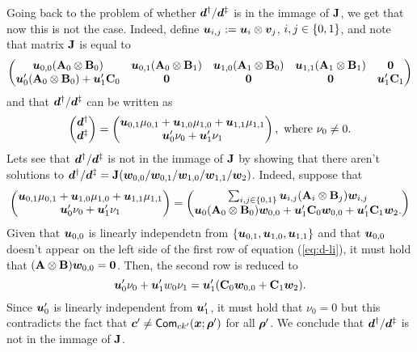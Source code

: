 Going back to the problem of whether ${\boldsymbol{d}}^\dag/ {\boldsymbol{d}}^\ddag$ is in the immage of $\mathbf{{J}}$, we get that now this is not the case. Indeed, define ${\boldsymbol{u}}_{i,j}:={\boldsymbol{u}}_i\otimes{\boldsymbol{v}}_j$, $i,j\in\{0,1\}$, and note that matrix $\mathbf{{J}}$ is equal to
$$
\begin{pmatrix}
{\boldsymbol{u}}_{0,0}(\mathbf{{A}}_0\otimes\mathbf{{B}}_0) & {\boldsymbol{u}}_{0,1}(\mathbf{{A}}_0\otimes\mathbf{{B}}_1) & {\boldsymbol{u}}_{1,0}(\mathbf{{A}}_1\otimes\mathbf{{B}}_0) & {\boldsymbol{u}}_{1,1}(\mathbf{{A}}_1\otimes\mathbf{{B}}_1) & {\boldsymbol{0}}\\
{\boldsymbol{u}}'_0(\mathbf{{A}}_0\otimes\mathbf{{B}}_0) +{\boldsymbol{u}}'_1\mathbf{{C}}_0 & {\boldsymbol{0}} & {\boldsymbol{0}} & {\boldsymbol{0}} & {\boldsymbol{u}}'_1\mathbf{{C}}_1
\end{pmatrix}
$$
and that ${\boldsymbol{d}}^\dag/{\boldsymbol{d}}^\ddag$ can be written as
$$
\begin{pmatrix} {\boldsymbol{d}}^\dag\\ {\boldsymbol{d}}^\ddag \end{pmatrix}
=
\begin{pmatrix}
{\boldsymbol{u}}_{0,1}\mu_{0,1} + {\boldsymbol{u}}_{1,0}\mu_{1,0} + {\boldsymbol{u}}_{1,1}\mu_{1,1}\\
{\boldsymbol{u}}'_{0}\nu_{0} + {\boldsymbol{u}}'_1\nu_1
\end{pmatrix},
\text{ where } \nu_0 \neq 0.
$$
Lets see that ${\boldsymbol{d}}^\dag/{\boldsymbol{d}}^\ddag$ is not in the immage of $\mathbf{{J}}$ by showing that there aren't solutions to ${\boldsymbol{d}}^\dag/{\boldsymbol{d}}^\ddag=\mathbf{{J}}({\boldsymbol{w}}_{0,0}/{\boldsymbol{w}}_{0,1}/{\boldsymbol{w}}_{1,0}/{\boldsymbol{w}}_{1,1}/{\boldsymbol{w}}_2)$. Indeed, suppose that
\begin{align}
\begin{pmatrix}
{\boldsymbol{u}}_{0,1}\mu_{0,1} + {\boldsymbol{u}}_{1,0}\mu_{1,0} + {\boldsymbol{u}}_{1,1}\mu_{1,1}\\
{\boldsymbol{u}}'_{0}\nu_{0} + {\boldsymbol{u}}'_1\nu_1
\end{pmatrix}
=
\begin{pmatrix}
\sum_{i,j\in\{0,1\}}{\boldsymbol{u}}_{i,j}(\mathbf{{A}}_i\otimes\mathbf{{B}}_j){\boldsymbol{w}}_{i,j}\\
{\boldsymbol{u}}_0(\mathbf{{A}}_0\otimes\mathbf{{B}}_0){\boldsymbol{w}}_{0,0} + {\boldsymbol{u}}'_1\mathbf{{C}}_0{\boldsymbol{w}}_{0,0}+{\boldsymbol{u}}'_1\mathbf{{C}}_1{\boldsymbol{w}}_2.
\end{pmatrix}
\label{eq:d-li}
\end{align}
Given that ${\boldsymbol{u}}_{0,0}$ is linearly independetn from $\{{\boldsymbol{u}}_{0,1},{\boldsymbol{u}}_{1,0},{\boldsymbol{u}}_{1,1}\}$ and that ${\boldsymbol{u}}_{0,0}$ doesn't appear on the left side of the first row of equation (\ref{eq:d-li}), it must hold that $(\mathbf{{A}}\otimes\mathbf{{B}}){\boldsymbol{w}}_{0,0}={\boldsymbol{0}}$. Then, the second row is reduced to
$$
{\boldsymbol{u}}'_{0}\nu_{0} + {\boldsymbol{u}}'_1w_0\nu_1 = {\boldsymbol{u}}'_1(\mathbf{{C}}_0{\boldsymbol{w}}_{0,0}+\mathbf{{C}}_1{\boldsymbol{w}}_2).
$$
Since ${\boldsymbol{u}}'_0$ is linearly independent from ${\boldsymbol{u}}'_1$, it must hold that $\nu_0=0$ but this contradicts the fact that ${\boldsymbol{c}}'\neq\mathsf{Com}_{ck'}({\boldsymbol{x}};{\boldsymbol{\rho}}')$ for all ${\boldsymbol{\rho}}'$. We conclude that ${\boldsymbol{d}}^\dag/{\boldsymbol{d}}^\ddag$ is not in the immage of $\mathbf{{J}}$.

